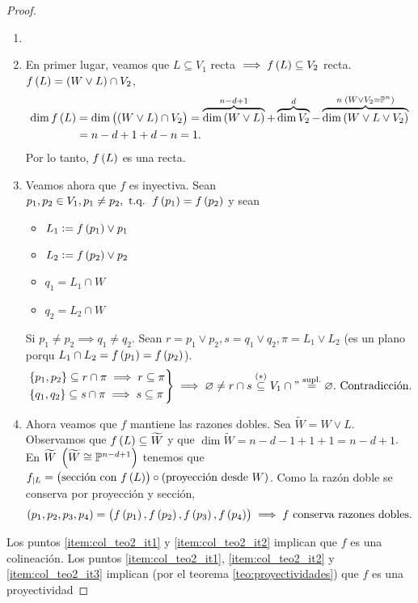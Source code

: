 \begin{proof}
	\begin{enumerate}[(1)]
		\item[]
		\item \label{item:col_teo2_it1} En primer lugar, veamos que $L \subseteq V_1$ recta $\implies f \lp L \rp \subseteq V_2$ recta. $f \lp L \rp = \lp W \vee L \rp \cap V_2$,
		\begin{align*}
			\dim f \lp L \rp &= \dim \lp \lp W \vee L \rp \cap V_2 \rp = \overbrace{\dim \lp W \vee L \rp}^{n-d+1} + \overbrace{\dim V_2}^d - \overbrace{\dim \lp W \vee L \vee V_2 \rp}^{n \; \lp W \vee V_2 = \Po^n \rp} \\
			&= n - d + 1 + d - n = 1.
		\end{align*}
		Por lo tanto, $f \lp L \rp$ es una recta.
		\item \label{item:col_teo2_it2} Veamos ahora que $f$ es inyectiva. Sean $p_1, p_2 \in V_1, p_1 \neq p_2, \tq f \lp p_1 \rp = f \lp p_2 \rp$ y sean
		\begin{itemize}
			\item $L_1 := f \lp p_1 \rp \vee p_1$
			\item $L_2 := f \lp p_2 \rp \vee p_2$
			\item $q_1 = L_1 \cap W$
			\item $q_2 = L_2 \cap W$
		\end{itemize}
		Si $p_1 \neq p_2 \implies q_1 \neq q_2$. Sean $r = p_1 \vee p_2, s = q_1 \vee q_2, \pi = L_1 \vee L_2$ (es un plano porqu $L_1 \cap L_2 = f \lp p_1 \rp = f \lp p_2 \rp$).
		\begin{gather*}
			\begin{rcases}
				\{ p_1, p_2 \} \subseteq r \cap \pi \implies r \subseteq \pi \\
				\{ q_1, q_2 \} \subseteq s \cap \pi \implies s \subseteq \pi
			\end{rcases}
			\implies \emptyset \neq r \cap s \stackrel{(*)}{\subseteq} V_1 \cap " \stackrel{\text{supl.}}{=} \emptyset. \text{ Contradicción.}
		\end{gather*}
		\item \label{item:col_teo2_it3} Ahora veamos que $f$ mantiene las razones dobles. Sea $\widetilde{W} = W \vee L $. Observamos que $f \lp L \rp \subseteq \widetilde{W}$ y que $\dim \widetilde{W} = n-d-1+1+1= n-d+1$. \\
		En $\widetilde{W} \; \lp \widetilde{W}\cong\Po^{n-d+1} \rp$ tenemos que $f_{|L} = \lp \text{sección con }f \lp L \rp \rp \circ \lp \text{proyección desde } W \rp$. Como la razón doble se conserva por proyección y sección,
		\[ \lp p_1, p_2, p_3, p_4 \rp = \lp f \lp p_1 \rp, f \lp p_2 \rp, f \lp p_3 \rp, f \lp p_4 \rp \rp \implies f \text{ conserva razones dobles.}
		\]
	\end{enumerate}
	\noindent Los puntos \eqref{item:col_teo2_it1} y \eqref{item:col_teo2_it2} implican que $f$ es una colineación. Los puntos \eqref{item:col_teo2_it1}, \eqref{item:col_teo2_it2} y \eqref{item:col_teo2_it3} implican (por el teorema \ref{teo:proyectividades}) que $f$ es una proyectividad
\end{proof}
